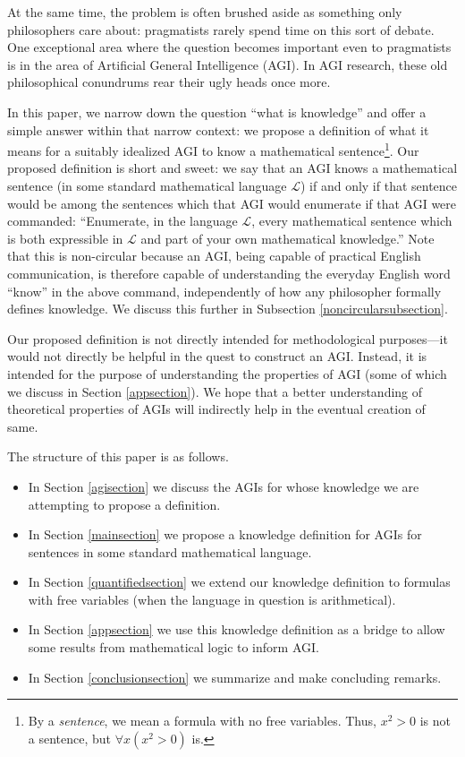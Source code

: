 \documentclass[runningheads]{llncs}
\begin{document}
At the same time, the problem is often brushed aside as something only
philosophers care about: pragmatists rarely spend time
on this sort of debate. One exceptional area where the question becomes
important even to pragmatists is in the area of Artificial General Intelligence
(AGI). In AGI research, these old philosophical conundrums rear their ugly heads
once more.

In this paper, we narrow down the question ``what is knowledge'' and offer
a simple answer within that narrow context:
we propose a definition of what it means for a suitably idealized AGI to know
a mathematical sentence\footnote{By a \emph{sentence}, we mean a formula with
no free variables. Thus, $x^2>0$ is not a sentence, but
$\forall x (x^2>0)$ is.}. Our proposed definition is short and
sweet: we say that
an AGI knows a mathematical sentence (in some standard mathematical language $\mathscr L$)
if and only if that sentence would be among the sentences which that AGI would
enumerate if that AGI were commanded:
``Enumerate, in the language $\mathscr L$, every mathematical sentence which
is both expressible in $\mathscr L$ and part of your own mathematical knowledge.''
Note that this is non-circular because an AGI, being capable of practical English
communication, is therefore capable of understanding the everyday English word
``know'' in the above command, independently of how any philosopher formally
defines knowledge. We discuss this further in Subsection \ref{noncircularsubsection}.

Our proposed definition is not directly intended
for methodological purposes---it would not
directly be helpful in the quest to construct an AGI. Instead, it is intended for
the purpose of understanding the properties of AGI (some of which
we discuss in Section \ref{appsection}). We hope that a better
understanding of theoretical properties of AGIs will indirectly help in the eventual
creation of same.

The structure of this paper is as follows.
\begin{itemize}
  \item In Section \ref{agisection} we discuss the AGIs for whose knowledge we are
  attempting to propose a definition.
  \item In Section \ref{mainsection} we propose a knowledge definition for
  AGIs for sentences in some standard mathematical language.
  \item In Section \ref{quantifiedsection} we extend our knowledge definition
  to formulas with free variables (when the
  language in question is arithmetical).
  \item In Section \ref{appsection} we use this knowledge definition as a bridge
  to allow some results from mathematical logic to inform AGI.
  \item In Section \ref{conclusionsection} we summarize and make concluding remarks.
\end{itemize}
\end{document}
